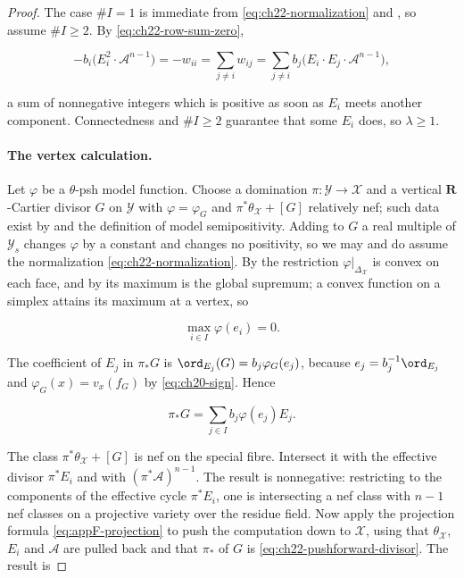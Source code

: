 \begin{proof}
The case \(\#I=1\) is immediate from
\eqref{eq:ch22-normalization} and
, so assume \(\#I\geq2\).  By
\eqref{eq:ch22-row-sum-zero},

\[
 -b_i\bigl(E_i^2\cdot\mathcal A^{n-1}\bigr)
 =-w_{ii}
 =\sum_{j\neq i}w_{ij}
 =\sum_{j\neq i}b_j\bigl(E_i\cdot E_j\cdot\mathcal A^{n-1}\bigr),
\]

a sum of nonnegative integers which is positive as soon as \(E_i\) meets
another component.  Connectedness and \(\#I\geq2\) guarantee that some \(E_i\) does,
so \(\lambda\geq1\).

\paragraph{The vertex calculation.}
Let \(\varphi\) be a \(\theta\)-psh model function.  Choose a domination
\(\pi:\mathcal Y\to\mathcal X\) and a vertical \(\mathbf R\)-Cartier divisor
\(G\) on \(\mathcal Y\) with \(\varphi=\varphi_G\) and
\(\pi^*\theta_{\mathcal X}+[G]\) relatively nef; such data exist by
 and the definition of model
semipositivity.  Adding to \(G\) a real multiple of \(\mathcal Y_s\) changes
\(\varphi\) by a constant and changes no positivity, so we may and do assume
the normalization \eqref{eq:ch22-normalization}.  By
 the restriction
\(\varphi|_{\Delta_{\mathcal X}}\) is convex on each face, and by
 its maximum is the global supremum; a
convex function on a simplex attains its maximum at a vertex, so

\[
                         \max_{i\in I}\varphi(e_i)=0 .
\tag{22.26}\label{eq:ch22-vertex-max}
\]

The coefficient of \(E_j\) in \(\pi_*G\) is
\(\ord_{E_j}(G)=b_j\varphi_G(e_j)\), because
\(e_j=b_j^{-1}\ord_{E_j}\) and \(\varphi_G(x)=v_x(f_G)\) by
\eqref{eq:ch20-sign}.  Hence

\[
             \pi_*G=\sum_{j\in I}b_j\varphi(e_j)E_j.
\tag{22.27}\label{eq:ch22-pushforward-divisor}
\]

The class \(\pi^*\theta_{\mathcal X}+[G]\) is nef on the special fibre.
Intersect it with the effective divisor \(\pi^*E_i\) and with
\((\pi^*\mathcal A)^{n-1}\).  The result is nonnegative: restricting to the
components of the effective cycle \(\pi^*E_i\), one is intersecting a nef
class with \(n-1\) nef classes on a projective variety over the residue
field.  Now apply the projection formula
\eqref{eq:appF-projection} to push the computation down to \(\mathcal X\),
using that \(\theta_{\mathcal X}\), \(E_i\) and \(\mathcal A\) are pulled
back and that \(\pi_*\) of \(G\) is \eqref{eq:ch22-pushforward-divisor}.
The result is


\end{proof}
